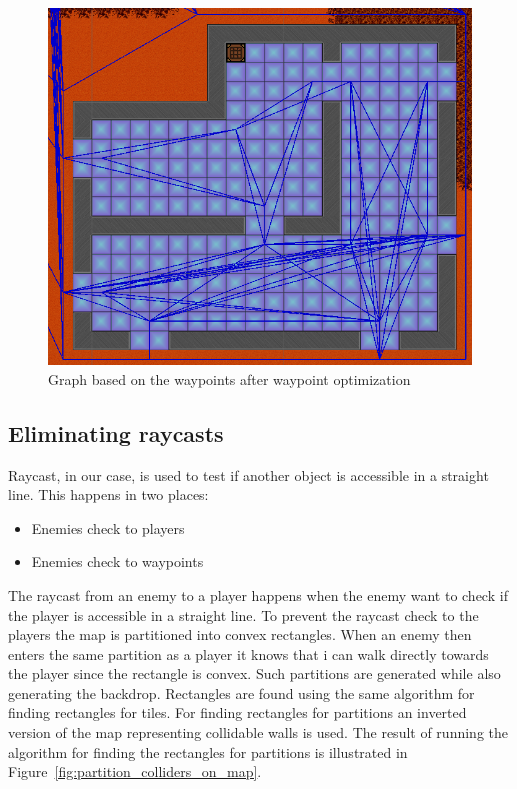 \begin{figure}[H]
	\includegraphics[width=\textwidth]{figures/astar/optimizedWaypointsGraph}
	\caption{Graph based on the waypoints after waypoint optimization}
	\label{waypointgraphOpt}
\end{figure}

\subsection*{Eliminating raycasts}
Raycast, in our case, is used to test if another object is accessible in a straight line.
This happens in two places:
\begin{itemize}
\item Enemies check to players
\item Enemies check to waypoints
\end{itemize}
The raycast from an enemy to a player happens when the enemy want to check if the player is accessible in a straight line.
To prevent the raycast check to the players the map is partitioned into convex rectangles.
When an enemy then enters the same partition as a player it knows that i can walk directly towards the player since the rectangle is convex.
Such partitions are generated while also generating the backdrop.
Rectangles are found using the same algorithm for finding rectangles for tiles. 
For finding rectangles for partitions an inverted version of the map representing collidable walls is used. 
The result of running the algorithm for finding the rectangles for partitions is illustrated in Figure~\ref{fig:partition_colliders_on_map}.

